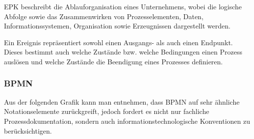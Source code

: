 EPK beschreibt die Ablauforganisation eines Unternehmens, wobei die logische
Abfolge sowie das Zusammenwirken von Prozesselementen, Daten,
Informationssystemen, Organisation sowie Erzeugnissen dargestellt werden.

\begin{figure}[H]
\begin{minipage}{\linewidth}
\begin{center}
\end{center}
\end{minipage}
\end{figure}


Ein Ereignis repräsentiert sowohl einen Ausgangs- als auch einen Endpunkt.
Dieses bestimmt auch welche Zustände bzw. welche Bedingungen einen Prozess 
auslösen und welche Zustände die Beendigung eines Prozesses definieren.

\subsubsection{BPMN}

Aus der folgenden Grafik kann man entnehmen, dass BPMN auf sehr ähnliche
Notationselemente zurückgreift, jedoch fordert es nicht nur 
fachliche Prozessdokumentation, sondern auch informationstechnologische 
Konventionen zu berücksichtigen.

\begin{figure}[H]
\begin{minipage}{\linewidth}
\begin{center}
\end{center}
\end{minipage}
\end{figure}

